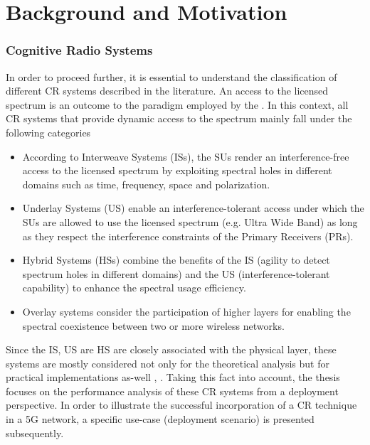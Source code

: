 \section{Background and Motivation}
\label{sec:mot}

\subsubsection*{Cognitive Radio Systems}
In order to proceed further, it is essential to understand the classification of different CR systems described in the literature. An access to the licensed spectrum is an outcome to the paradigm employed by the . In this context, all CR systems that provide dynamic access to the spectrum mainly fall under the following categories \cite{Goldsmith09} 
\begin{itemize}
\item According to Interweave Systems (ISs), the SUs render an interference-free access to the licensed spectrum by exploiting spectral holes in different domains such as time, frequency, space and polarization. 
\item Underlay Systems (US) enable an interference-tolerant access under which the SUs are allowed to use the licensed spectrum (e.g. Ultra Wide Band) as long as they respect the interference constraints of the Primary Receivers (PRs). 
\item Hybrid Systems (HSs) combine the benefits of the IS (agility to detect spectrum holes in different domains) and the US (interference-tolerant capability) to enhance the spectral usage efficiency.  
\item Overlay systems consider the participation of higher layers for enabling the spectral coexistence between two or more wireless networks. 
\end{itemize}
Since the IS, US are HS are closely associated with the physical layer, these systems are mostly considered not only for the theoretical analysis but for practical implementations as-well , \cite{Cabric04, Cabric06, Kim10}. Taking this fact into account, the thesis focuses on the performance analysis of these CR systems from a deployment perspective. In order to illustrate the successful incorporation of a CR technique in a 5G network, a specific use-case (deployment scenario) is presented subsequently. 




